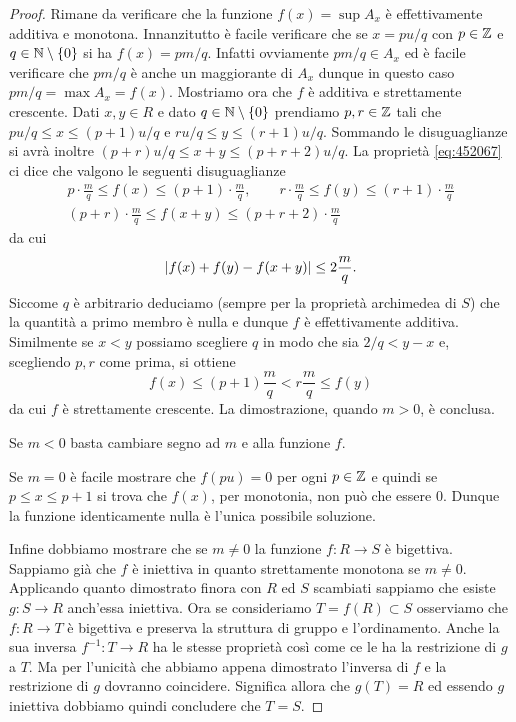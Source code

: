 \begin{proof}
Rimane da verificare che la funzione $f(x) = \sup A_x$ è effettivamente 
additiva e monotona. 
Innanzitutto è facile verificare che se $x= pu/q$ con $p\in \mathbb Z$ e 
$q\in \mathbb N\setminus{\left\{ 0 \right\}}$ si ha $f(x)= pm/q$. 
Infatti ovviamente $pm/q\in A_x$ ed è facile verificare che $pm/q$ 
è anche un maggiorante di $A_x$ dunque in questo caso 
$pm/q = \max A_x = f(x)$.
Mostriamo ora che $f$ è additiva e strettamente crescente.
Dati $x,y \in R$ e dato $q\in \mathbb N\setminus{\left\{ 0 \right\}}$ prendiamo $p,r\in \mathbb Z$ 
tali che $pu/q \le x \le (p+1)u/q$ e $ru/q \le y \le (r+1) u /q$.
Sommando le disuguaglianze si avrà inoltre $(p+r)u/q \le x+y \le (p+r+2)u/q$.
La proprietà \eqref{eq:452067}
ci dice che valgono le seguenti disuguaglianze
\begin{gather*}
  p\cdot \frac m q \le f(x) \le (p+1)\cdot \frac m q,\qquad 
  r\cdot \frac m q \le f(y) \le (r+1)\cdot \frac m q \\ 
  (p+r)\cdot \frac m q \le f(x+y) \le (p+r+2)\cdot \frac m q 
\end{gather*}
da cui 
\[
{\left|f(x)+f(y) - f(x+y)\right|} \le 2 \frac m q.  
\]
Siccome $q$ è arbitrario deduciamo (sempre per la proprietà archimedea 
di $S$) che la quantità a primo membro è nulla e dunque $f$ 
è effettivamente additiva.
Similmente se $x<y$ possiamo scegliere $q$ in modo che sia 
$2 / q  < y-x$ e, scegliendo $p,r$ come prima, si ottiene 
\[
f(x) \le (p+1)\frac m q < r \frac m q \le f(y)  
\]
da cui $f$ è strettamente crescente. 
La dimostrazione, quando $m>0$, è conclusa.

Se $m<0$ basta cambiare segno ad $m$ e alla funzione $f$.

Se $m=0$ è facile mostrare che $f(pu)=0$ per ogni $p\in \mathbb Z$ 
e quindi se $p \le x \le p+1$ si trova che $f(x)$, per monotonia,
non può che essere $0$. Dunque la funzione identicamente nulla 
è l'unica possibile soluzione. 

Infine dobbiamo mostrare che se $m\neq 0$ la funzione $f\colon R \to S$ 
è bigettiva. 
Sappiamo già che $f$ è iniettiva in quanto strettamente monotona 
se $m\neq 0$. 
Applicando quanto dimostrato finora con $R$ ed $S$ scambiati
sappiamo che esiste $g\colon S\to R$ anch'essa iniettiva.
Ora se consideriamo $T=f(R)\subset S$ osserviamo che $f\colon R\to T$ 
è bigettiva e preserva la struttura di gruppo e l'ordinamento.
Anche la sua inversa $f^{-1}\colon T \to R$ ha le stesse proprietà 
così come ce le ha la restrizione di $g$ a $T$.  
Ma per l'unicità che abbiamo appena dimostrato l'inversa di $f$ e la 
restrizione di $g$ dovranno coincidere. Significa allora che $g(T)=R$
ed essendo $g$ iniettiva dobbiamo quindi concludere che $T=S$.
\end{proof}

